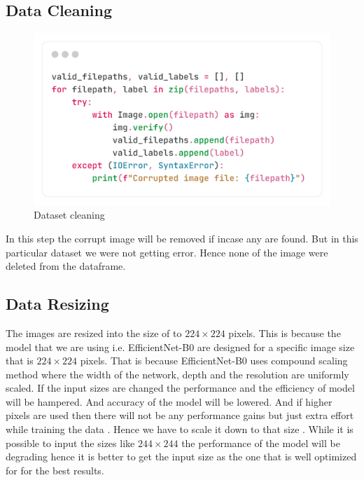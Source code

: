 \documentclass[12pt,onecolumn]{report}
\begin{document}
\subsection{Data Cleaning}
\begin{figure}[h!]
    \centering
    \includegraphics[width=0.8\columnwidth]{figures/data_cleaning.png}  %
    \caption{Dataset cleaning} %
    \label{fig:dataset_Cleaning} %
\end{figure}
In this step the corrupt image will be removed if incase any are found. But in this particular dataset we were not getting error. Hence none of the image were deleted from the dataframe.

\subsection{Data Resizing}
The images are resized into the size of to $224 \times 224$ pixels. This is because the model that we are using i.e. EfficientNet-B0 are designed for a specific image size that is $224 \times 224$ pixels. That is because EfficientNet-B0 uses compound scaling method where the width of the network, depth and the resolution are uniformly scaled. If the input sizes are changed the performance and the efficiency of model will be hampered. And accuracy of the model will be lowered. And if higher pixels are used then there will not be any performance gains but just extra effort while training the data . Hence we have to scale it down to that size \cite{tan2019efficientnet} \cite{efficientnet_medium} \cite{keras_efficientnet}. While it is possible to input the sizes like  $244 \times 244$ the performance of the model will be degrading hence it is better to get the input size as the one that is well optimized for for the best results. 
\end{document}
